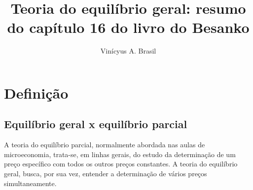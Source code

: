 \documentclass[oneside,12pt, letterpaper]{book}
\title{Teoria do equil{\'i}brio geral: resumo do cap{\'i}tulo 16 do livro do Besanko}
\author {Vin{\' i}cyus A. Brasil}
\begin{document}
\maketitle
\date{}

\chapter{Defini{\c c}{\~a}o} 
\section{Equil{\'i}brio geral x equil{\'i}brio parcial}
A teoria do equil{\'i}brio parcial, normalmente abordada nas aulas de microeconomia, trata-se, em linhas gerais, do estudo da determina{\c c}{\~a}o de um 
pre{\c c}o espec{\'i}fico com todos os outros pre{\c c}os constantes. A teoria do equil{\'i}brio geral, busca, por sua vez, entender a determina{\c c}{\~a}o de v{\'a}rios pre{\c c}os 
simultaneamente. 
\end{document}
